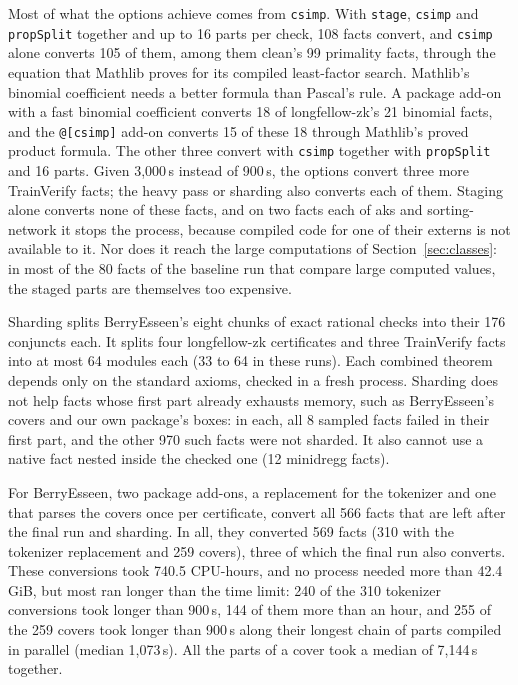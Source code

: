 \documentclass[11pt]{article}
\begin{document}
Most of what the options achieve comes from \texttt{csimp}. With \texttt{stage}, \texttt{csimp} and
\texttt{propSplit} together and up to 16 parts per check, 108 facts convert, and \texttt{csimp} alone converts
105 of them, among them clean's 99 primality facts, through the equation that Mathlib proves for its compiled
least-factor search. Mathlib's binomial coefficient needs a better formula than Pascal's rule. A package add-on
with a fast binomial coefficient converts 18 of longfellow-zk's 21 binomial facts, and the \verb|@[csimp]|
add-on converts 15 of these 18 through Mathlib's proved product formula. The other three convert with
\texttt{csimp} together with \texttt{propSplit} and 16 parts. Given 3,000\,s instead of 900\,s, the options convert three more
TrainVerify facts; the heavy pass or sharding also converts each of them. Staging alone converts none of these
facts, and on two facts each of aks and sorting-network it stops the process, because compiled code for one of
their externs is not available to it. Nor does it reach the large computations
of Section~\ref{sec:classes}: in most of the 80 facts of the baseline run that compare large computed values,
the staged parts are themselves too expensive.

Sharding splits BerryEsseen's eight chunks of exact rational checks into their 176 conjuncts each. It splits
four longfellow-zk certificates and three TrainVerify facts into at most 64 modules each (33 to 64 in these
runs).
Each combined theorem depends only on the standard axioms, checked in a fresh process. Sharding does not help
facts whose first part already exhausts memory, such as BerryEsseen's covers and our own package's boxes: in
each, all 8 sampled facts failed in their first part, and the other 970 such facts were not sharded. It also
cannot use a native fact nested inside the checked one (12 minidregg facts).

For BerryEsseen, two package add-ons, a replacement for the tokenizer and one that parses the covers once per
certificate, convert all 566 facts that are left after the final run and sharding. In all, they converted
569 facts (310 with the tokenizer replacement and 259 covers), three of which the final run also converts.
These conversions took 740.5 CPU-hours, and no process needed more than 42.4\,GiB, but most ran longer than the
time limit: 240 of the 310 tokenizer conversions took longer than 900\,s, 144 of them more than an hour, and
255 of the 259 covers took longer than 900\,s along their longest chain of parts compiled in parallel (median
1,073\,s). All the parts of a cover took a median of 7,144\,s together.
\end{document}
